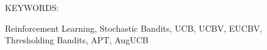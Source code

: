 \documentclass[MS,twoside]{iitmdiss}
\begin{document}
\acknowledgements




\abstract


\noindent KEYWORDS: \hspace*{0.5em} \parbox[t]{4.4in}{Reinforcement Learning, Stochastic Bandits, UCB, UCBV, EUCBV, Thresholding Bandits, APT, AugUCB}

\vspace*{24pt}

\noindent 



\end{document}
